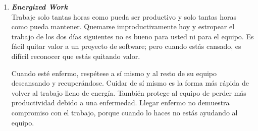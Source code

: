 \begin{spacing}{1.5}
\begin{enumerate}
				\begin{figure}[H]
					\centering
					\texttt{[image: xp\_2]}
					\caption {\centering \small{Historias de usuario en una pared}} \label{figure:chaperII_3}
					\small {Fuente: ``Extreme Programming Explained: Embrace Change, 2nd Ed." por Beck, Kent and Andres - Cynthia, 2004, Copyright by Addison-Wesley Professional.}
				\end{figure}
				El espacio de trabajo (Figura \ref{figure:chaperII_4} ) también debe cubrir otras necesidades humanas. El agua y los bocadillos brindan consuelo y fomentan las interacciones sociales positivas. La limpieza y el orden dejan la mente libre para pensar en los problemas en cuestión. Si bien la programación ocurre en un espacio público, las personas también necesitan privacidad, que puede proporcionarse mediante cubos separados o limitando las horas de trabajo.
				\begin{figure}[H]
					\centering
					\texttt{[image: xp\_3]}
					\caption {\centering \small{Espacio de trabajo de un equipo}} \label{figure:chaperII_4}
					\small {Fuente: ``Extreme Programming Explained: Embrace Change, 2nd Ed." por Beck, Kent and Andres - Cynthia, 2004, Copyright by Addison-Wesley Professional.}
				\end{figure}
				
				\item \textit{\textbf{Energized Work}}\\
				Trabaje solo tantas horas como pueda ser productivo y solo tantas horas como pueda mantener. Quemarse improductivamente hoy y estropear el trabajo de los dos días siguientes no es bueno para usted ni para el equipo.
				Es fácil quitar valor a un proyecto de software; pero cuando estás cansado, es difícil reconocer que estás quitando valor\cite{chap2_extreme_programming}.
				
				Cuando esté enfermo, respétese a sí mismo y al resto de su equipo descansando y recuperándose. Cuidar de sí mismo es la forma más rápida de volver al trabajo lleno de energía. También protege al equipo de perder más productividad debido a una enfermedad. Llegar enfermo no demuestra compromiso con el trabajo, porque cuando lo haces no estás ayudando al equipo.
				

\end{enumerate}
\end{spacing}
